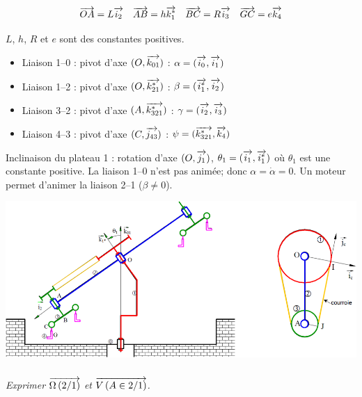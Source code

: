 \documentclass[10pt]{article}
\begin{document}
{$$
\overrightarrow{OA}=L\overrightarrow{i_2} \quad \overrightarrow{AB}=h\overrightarrow{k_1^*} \quad \overrightarrow{BC}=R\overrightarrow{i_3} \quad \overrightarrow{GC}=e\overrightarrow{k_4} 
$$

$L$, $h$, $R$ et $e$ sont des constantes positives.

\begin{itemize}
\item Liaison 1--0 : pivot d'axe $(O,\overrightarrow{k_{01}})$ : $\alpha = (\overrightarrow{i_0},\overrightarrow{i_1})$
\item Liaison 1--2 : pivot d'axe $(O,\overrightarrow{k_{21}^*})$ : $\beta = (\overrightarrow{i_1^*},\overrightarrow{i_2})$
\item Liaison 3--2 : pivot d'axe $(A,\overrightarrow{k_{321}^*})$ : $\gamma = (\overrightarrow{i_2},\overrightarrow{i_3})$
\item Liaison 4--3 : pivot d'axe $(C,\overrightarrow{j_{43}})$ : $\psi = (\overrightarrow{k_{321}^*},\overrightarrow{k_4})$
\end{itemize}

Inclinaison du plateau 1 : rotation d'axe $(O,\overrightarrow{j_1})$, $\theta_1=(\overrightarrow{i_1},\overrightarrow{i_1^*})$ où $\theta_1$ est une constante positive. La liaison 1--0 n'est pas animée; donc $\alpha=\dot{\alpha}=0$. Un moteur permet d'animer la liaison 2--1 ($\beta\neq0$). 


\begin{center}
 \includegraphics[width=\textwidth]{images/exo2}
\end{center}
}

\subparagraph{}
\textit{Exprimer $\overrightarrow{\Omega\left( {2}/{1}\right)}$ et $\overrightarrow{V\left( {A} \in {2}/{1}\right)}$.}
\end{document}
